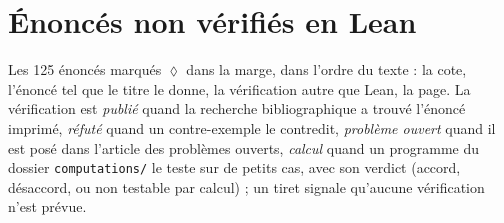 \section*{Énoncés non vérifiés en Lean}

Les 125 énoncés marqués \textcolor{piste}{\ensuremath{\lozenge}} dans la marge, dans l'ordre du texte : la cote, l'énoncé tel que le titre le donne, la vérification autre que Lean, la page. La vérification est \emph{publié} quand la recherche bibliographique a trouvé l'énoncé imprimé, \emph{réfuté} quand un contre-exemple le contredit, \emph{problème ouvert} quand il est posé dans l'article des problèmes ouverts, \emph{calcul} quand un programme du dossier \texttt{computations/} le teste sur de petits cas, avec son verdict (accord, désaccord, ou non testable par calcul) ; un tiret signale qu'aucune vérification n'est prévue.

